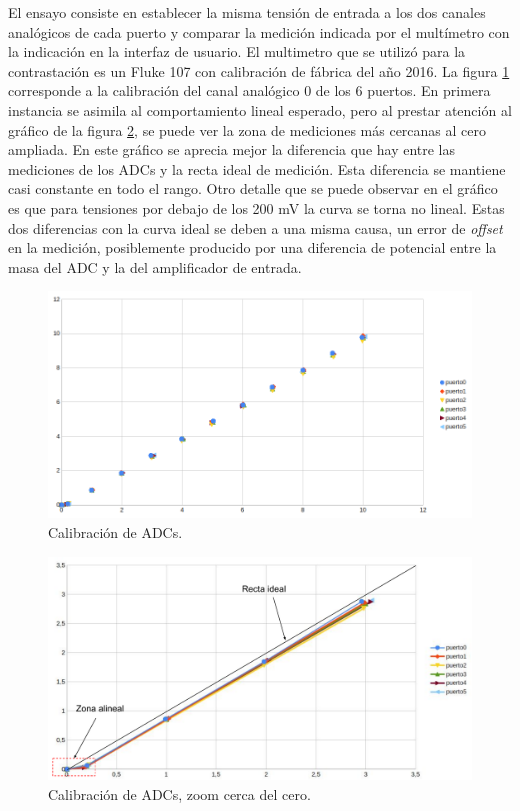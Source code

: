 El ensayo consiste en establecer la misma tensión de entrada a los dos canales analógicos de cada puerto y comparar la medición indicada por el multímetro con la indicación en la interfaz de usuario. El multimetro que se utilizó para la contrastación es un Fluke 107 con calibración de fábrica del año 2016.
La figura \ref{fig:CalADCs} corresponde a la calibración del canal analógico 0 de los 6 puertos. En primera instancia se asimila al comportamiento lineal esperado, pero al prestar atención al gráfico de la figura \ref{fig:CalADCzoom}, se puede ver la zona de mediciones más cercanas al cero ampliada. En este gráfico se aprecia mejor la diferencia que hay entre las mediciones de los ADCs y la recta ideal de medición. Esta diferencia se mantiene casi constante en todo el rango. 
Otro detalle que se puede observar en el gráfico es que para tensiones por debajo de los 200 mV  la curva se torna no lineal.
Estas dos diferencias con la curva ideal se deben a una misma causa, un error de \textit{offset} en la medición, posiblemente producido por una diferencia de potencial entre la masa del ADC y la del amplificador de entrada. 

\begin{figure}[H]
	\centering
	\includegraphics[width=1\textwidth]{./Figures/CalADCs.png}
	\caption{Calibración de ADCs.}
	\label{fig:CalADCs}
\end{figure}

\begin{figure}[H]
	\centering
	\includegraphics[width=1\textwidth]{./Figures/CalADCzoom.pdf}
	\caption{Calibración de ADCs, zoom cerca del cero.}
	\label{fig:CalADCzoom}
\end{figure}

